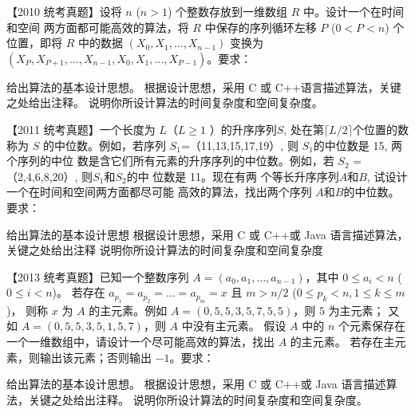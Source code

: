\begin{qitems}
    \begin{bbox}
        \qitem 【2010 统考真题】设将 $n$ ($n>1$) 个整数存放到一维数组 $R$ 中。设计一个在时间和空间
        两方面都可能高效的算法，将 $R$ 中保存的序列循环左移 $P$ ($0<P<n$) 个位置，即将 $R$
        中的数据 $(X_0, X_1, \dots, X_{n-1})$ 变换为 $(X_P, X_{P+1}, \dots, X_{n-1}, X_0, X_1, \dots, X_{P-1})$。要求：
        \begin{subqitems}
            \subqitem 给出算法的基本设计思想。
            \subqitem 根据设计思想，采用 C 或 C++语言描述算法，关键之处给出注释。
            \subqitem 说明你所设计算法的时间复杂度和空间复杂度。
        \end{subqitems}
    \end{bbox}

    \begin{bbox}
        \qitem 【2011 统考真题】一个长度为 $L$（$L\geqslant 1$ ）的升序序列$ S$, 处在第$\lceil L/2\rceil $个位置的数称为 $S$
        的中位数。例如，若序列 $S_1$=（11,13,15,17,19）, 则 $S_1$的中位数是 15, 两个序列的中位
        数是含它们所有元素的升序序列的中位数。例如，若 $S_2$ =（2,4,6,8,20）, 则$S_1$和$S_2$的中
        位数是 11。现在有两 个等长升序序列$A$和$B$, 试设计一个在时间和空间两方面都尽可能
        高效的算法，找出两个序列 $A$和$B$的中位数。要求：
        \begin{subqitems}
            \subqitem 给出算法的基本设计思想
            \subqitem  根据设计思想，采用 C 或 C++或 Java 语言描述算法，关键之处给出注释
            \subqitem 说明你所设计算法的时间复杂度和空间复杂度
        \end{subqitems}
    \end{bbox}

    \begin{bbox}
        \qitem 【2013 统考真题】已知一个整数序列 $A=(a_0, a_1, \dots, a_{n-1})$，其中 $0 \le a_i < n$ ($0 \le i < n$)。
        若存在 $a_{p_1} = a_{p_2} = \dots = a_{p_m} = x$ 且 $m > n/2$ ($0 \le p_k < n, 1 \le k \le m$)，
        则称 $x$ 为 $A$ 的主元素。例如 $A=(0, 5, 5, 3, 5, 7, 5, 5)$，则 $5$ 为主元素；
        又如 $A=(0, 5, 5, 3, 5, 1, 5, 7)$，则 $A$ 中没有主元素。
        假设 $A$ 中的 $n$ 个元素保存在一个一维数组中，请设计一个尽可能高效的算法，找出 $A$ 的主元素。
        若存在主元素，则输出该元素；否则输出 $-1$。要求：
        \begin{subqitems}
            \subqitem 给出算法的基本设计思想。
            \subqitem 根据设计思想，采用 C 或 C++或 Java 语言描述算法，关键之处给出注释。
            \subqitem 说明你所设计算法的时间复杂度和空间复杂度。
        \end{subqitems}
    \end{bbox}


\end{qitems}
